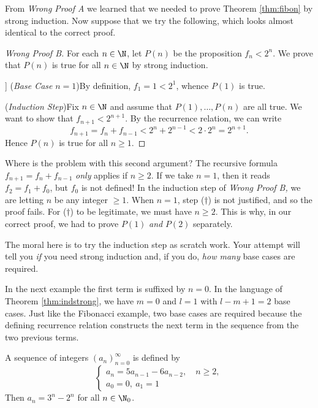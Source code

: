 From \emph{Wrong Proof A} we learned that we needed to prove Theorem \ref{thm:fibon} by strong induction. Now suppose that we try the following, which looks almost identical to the correct proof.

\begin{proof}[Wrong Proof B]
	For each $n\in\N$, let $P(n)$ be the proposition $f_n<2^n$. We prove that $P(n)$ is true for all $n\in\N$ by strong induction.\par]
	(\emph{Base Case} $n=1$)\quad By definition, $f_1=1<2^1$, whence $P(1)$ is true.\par
	(\emph{Induction Step})\quad Fix $n\in\N$ and assume that $P(1),\ldots,P(n)$ are all true. We want to show that $f_{n+1}<2^{n+1}$. By the recurrence relation, we can write
	\[
		f_{n+1}=f_n+f_{n-1}<2^n+2^{n-1}<2\cdot 2^n=2^{n+1}.\tag*{($\dag$)}
	\]
	Hence $P(n)$ is true for all $n\ge 1$.
\end{proof}

Where is the problem with this second argument? The recursive formula $f_{n+1}=f_n+f_{n-1}$ \emph{only} applies if $n\ge 2$. If we take $n=1$, then it reads $f_2=f_1+f_0$, but $f_0$ is not defined! In the induction step of \emph{Wrong Proof B,} we are letting $n$ be any integer $\ge 1$. When $n=1$, step ($\dag$) is not justified, and so the proof fails. For ($\dag$) to be legitimate, we must have $n\ge 2$. This is why, in our correct proof, we had to prove $P(1)$ \emph{and} $P(2)$ separately.\par

The moral here is to try the induction step as scratch work. Your attempt will tell you \emph{if} you need strong induction and, if you do, \emph{how many} base cases are required.



In the next example the first term is suffixed by $n=0$. In the language of Theorem \ref{thm:indstrong}, we have $m=0$ and $l=1$ with $l-m+1=2$ base cases. Just like the Fibonacci example, two base cases are required because the defining recurrence relation constructs the next term in the sequence from the two previous terms.

\begin{thm}{}{}
	A sequence of integers $(a_n)_{n=0}^\infty$ is defined by
	\[
		\begin{cases}
			a_n=5a_{n-1}-6a_{n-2},\quad n\ge 2,\\
			a_0=0,\ a_1=1
		\end{cases}
	\]
	Then $a_n=3^n-2^n$ for all $n\in\N_0$.
\end{thm}

